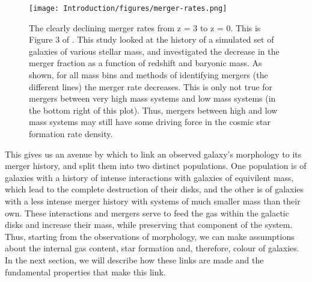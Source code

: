 \begin{figure}
    \centering
    \texttt{[image: Introduction/figures/merger-rates.png]}
    \caption{The clearly declining merger rates from z = 3 to z = 0. This is Figure 3 of \citet{2010ApJ...715..202H}. This study looked at the history of a simulated set of galaxies of various stellar mass, and investigated the decrease in the merger fraction as a function of redshift and baryonic mass. As shown, for all mass bins and methods of identifying mergers (the different lines) the merger rate decreases. This is only not true for mergers between very high mass systems and low mass systems (in the bottom right of this plot). Thus, mergers between high and low mass systems may still have some driving force in the cosmic star formation rate density.}
    \label{fig:merger-rate}
\end{figure}

This gives us an avenue by which to link an observed galaxy's morphology to its merger history, and split them into two distinct populations. One population is of galaxies with a history of intense interactions with galaxies of equivilent mass, which lead to the complete destruction of their disks, and the other is of galaxies with a less intense merger history with systems of much smaller mass than their own. These interactions and mergers serve to feed the gas within the galactic disks and increase their mass, while preserving that component of the system. Thus, starting from the observations of morphology, we can make assumptions about the internal gas content, star formation and, therefore, colour of galaxies. In the next section, we will describe how these links are made and the fundamental properties that make this link.

